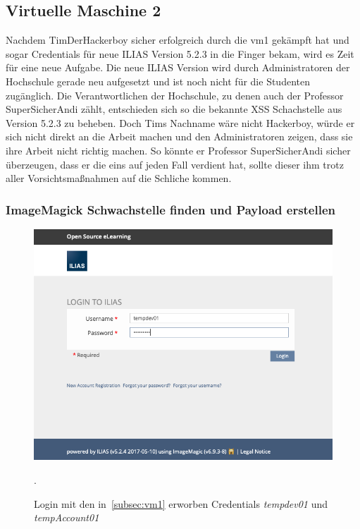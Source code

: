 \documentclass[10pt, a4paper,onecolumn ,titlepage]{article}
\begin{document}
    \subsection{Virtuelle Maschine 2}
    \label{subsec:vm2}
    Nachdem TimDerHackerboy sicher erfolgreich durch die \ac{vm}1 gekämpft hat und sogar Credentials für neue ILIAS Version 5.2.3 in die Finger bekam, wird es Zeit für eine neue Aufgabe.
    Die neue ILIAS Version wird durch Administratoren der Hochschule gerade neu aufgesetzt und ist noch nicht für die Studenten zugänglich.
    Die Verantwortlichen der Hochschule, zu denen auch der Professor SuperSicherAndi zählt, entschieden sich so die bekannte XSS Schachstelle aus Version 5.2.3 zu beheben.
    Doch Tims Nachname wäre nicht Hackerboy, würde er sich nicht direkt an die Arbeit machen und den Administratoren zeigen, dass sie ihre Arbeit nicht richtig machen.
    So könnte er Professor SuperSicherAndi sicher überzeugen, dass er die eins auf jeden Fall verdient hat, sollte dieser ihm trotz aller Vorsichtsmaßnahmen auf die Schliche kommen.

    \subsubsection{ImageMagick Schwachstelle finden und Payload erstellen}
    \label{subsubsec:imageMagickFinden}

    \begin{figure}[H]
        \centering
        \includegraphics[width=1\textwidth]{storyline_bilder_vm2/loginAlsDev01}
        \caption{Login mit den in~\ref{subsec:vm1} erworben Credentials \textit{tempdev01}
        \break und \textit{tempAccount01}} .
        \label{fig:loginAlsDev}
    \end{figure}
    
\end{document}
